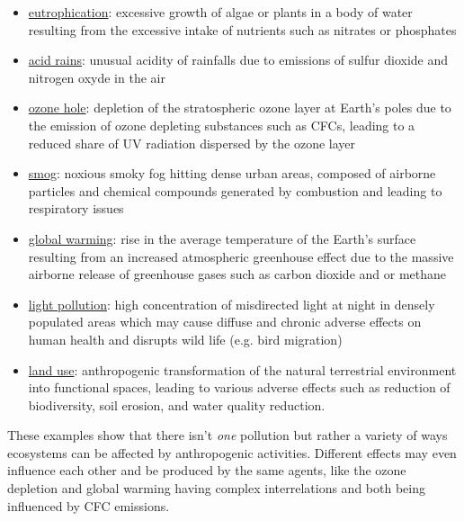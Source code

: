 \documentclass{article}
\begin{document}
\begin{itemize} %
	\item \href{https://en.wikipedia.org/wiki/Eutrophication}{eutrophication}: excessive growth of algae or plants in a body of water resulting from the excessive intake of nutrients such as nitrates or phosphates
	\item \href{https://en.wikipedia.org/wiki/Acid_rain}{acid rains}: unusual acidity of rainfalls due to emissions of sulfur dioxide and nitrogen oxyde in the air
	\item \href{https://en.wikipedia.org/wiki/Ozone_depletion}{ozone hole}: depletion of the stratospheric ozone layer at Earth's poles due to the emission of ozone depleting substances such as CFCs, leading to a reduced share of UV radiation dispersed by the ozone layer
	\item \href{https://en.wikipedia.org/wiki/Smog}{smog}: noxious smoky fog hitting dense urban areas, composed of airborne particles and chemical compounds generated by combustion and leading to respiratory issues
	\item \href{https://en.wikipedia.org/wiki/Global_warming}{global warming}: rise in the average temperature of the Earth's surface resulting from an increased atmospheric greenhouse effect due to the massive airborne release of greenhouse gases such as carbon dioxide and or methane
	\item \href{https://en.wikipedia.org/wiki/Light_pollution}{light pollution}: high concentration of misdirected light at night in densely populated areas which may cause diffuse and chronic adverse effects on human health and disrupts wild life (e.g. bird migration) 
	\item \href{https://en.wikipedia.org/wiki/Land_use}{land use}: anthropogenic transformation of the natural terrestrial environment into functional spaces, leading to various adverse effects such as reduction of biodiversity, soil erosion, and water quality reduction. 
\end{itemize}
These examples show that there isn't \emph{one} pollution but rather a variety of ways ecosystems can be affected by anthropogenic activities. Different effects may even influence each other and be produced by the same agents, like the ozone depletion and global warming having complex interrelations and both being influenced by CFC emissions. 
\end{document}
